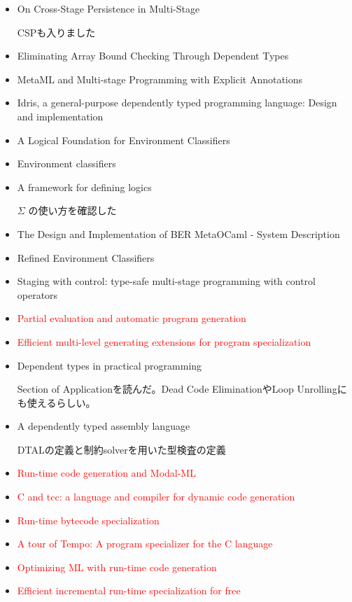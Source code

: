 \documentclass[runningheads]{llncs}
\newcommand{\red}[1]{\textcolor{red}{#1 }}
\begin{document}
\begin{itemize}
   \item On Cross-Stage Persistence in Multi-Stage\cite{Hanada2014}

   CSPも入りました
   \item Eliminating Array Bound Checking Through Dependent Types\cite{Xi98}
   \item MetaML and Multi-stage Programming with Explicit Annotations\cite{MetaML}
   \item Idris, a general-purpose dependently typed programming language: Design and implementation\cite{brady2013idris}
   \item A Logical Foundation for Environment Classifiers\cite{Tsukada}
   \item Environment classifiers\cite{taha2003environment}
   \item A framework for defining logics\cite{harper1993framework}

    $\Sigma$ の使い方を確認した
   \item The Design and Implementation of {BER} MetaOCaml - System Description\cite{oleg2014}
   \item Refined Environment Classifiers\cite{kiselyov2016refined}
   \item Staging with control: type-safe multi-stage programming with control operators\cite{oishi2017staging}
   \item \red{Partial evaluation and automatic program generation}\cite{jones1993partial}
   \item \red{Efficient multi-level generating extensions for program specialization}\cite{gluck1995efficient}
   \item Dependent types in practical programming\cite{xi1999dependent}

        Section of Applicationを読んだ。Dead Code EliminationやLoop Unrollingにも使えるらしい。

   \item A dependently typed assembly language\cite{xi2001dependently}

   DTALの定義と制約solverを用いた型検査の定義
   \item \red{Run-time code generation and Modal-ML}\cite{wickline1998run}
   \item \red{C and tcc: a language and compiler for dynamic code generation}\cite{poletto1999c}
   \item \red{Run-time bytecode specialization}\cite{masuhara2001run}
   \item \red{A tour of Tempo: A program specializer for the C language}\cite{consel2004tour}
   \item \red{Optimizing ML with run-time code generation}\cite{lee1996optimizing}
   \item \red{Efficient incremental run-time specialization for free}\cite{marlet1999efficient}

\end{itemize}
\end{document}
